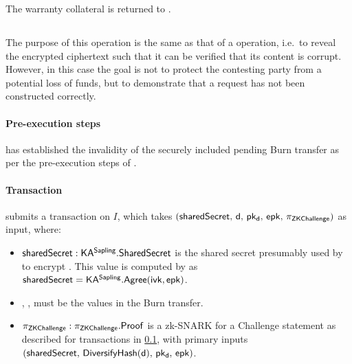 The warranty collateral \iw is returned to \redeemer.

\subsection{\challengeRedeemop}
\label{sec:challengeRedeem}

The purpose of this operation is the same as that of a \confirmIssueop operation, i.e.\ to reveal the encrypted ciphertext such that it can be verified that its content is corrupt.
However, in this case the goal is not to protect the contesting party from a potential loss of funds, but to demonstrate that a request has not been constructed correctly.

\paragraph{Pre-execution steps}
\vault has established the invalidity of the securely included pending Burn transfer as per the pre-execution steps of \confirmRedeemop.

\paragraph{Transaction}
\vault submits a \challengeRedeemop transaction on $I$, which takes $(\mathsf{sharedSecret},\, \mathsf{d},\, \mathsf{pk_d},\, \mathsf{epk},\, \pi_{\mathsf{ZKChallenge}})$ as input, where:
\begin{itemize}
    \item $\mathsf{sharedSecret} : \mathsf{KA^{Sapling}}.\mathsf{SharedSecret}$ is the shared secret presumably used by \redeemer to encrypt \nenc.
    This value is computed by \vault as $\mathsf{sharedSecret} = \mathsf{KA^{Sapling}}.\mathsf{Agree}(\mathsf{ivk}, \mathsf{epk})$.
    
    \item \dvf, \pkd, \epk must be the values in the Burn transfer.
    
    \item $\pi_{\mathsf{ZKChallenge}} : \pi_{\mathsf{ZKChallenge}}.\mathsf{Proof}$ is a \groth zk-SNARK for a Challenge statement as described for \challengeRedeem transactions in \cref{sec:challengeRedeem}, with primary inputs $(\mathsf{sharedSecret},\, \mathsf{DiversifyHash}(\mathsf{d}),\, \mathsf{pk_d},\, \mathsf{epk})$.
\end{itemize}

